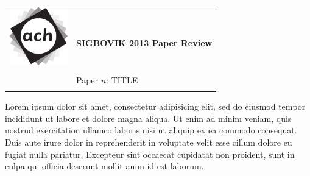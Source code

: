 \documentclass[12pt]{article}
\begin{document}
{\sffamily
\begin{tabular}{ll}
\multirow{2}{*}{\includegraphics[width=1in]{ach.png}}\\
& \textbf{\Huge{SIGBOVIK 2013 Paper Review}} \\
&\\
& \LARGE{Paper $n$: TITLE} \\
&\\
\hline
\end{tabular}}
\vspace{2em}

\vspace{1em}

\noindent
Lorem ipsum dolor sit amet, consectetur adipisicing elit, sed do eiusmod tempor
incididunt ut labore et dolore magna aliqua. Ut enim ad minim veniam, quis
nostrud exercitation ullamco laboris nisi ut aliquip ex ea commodo consequat.
Duis aute irure dolor in reprehenderit in voluptate velit esse cillum dolore eu
fugiat nulla pariatur. Excepteur sint occaecat cupidatat non proident, sunt in
culpa qui officia deserunt mollit anim id est laborum.
\end{document}
